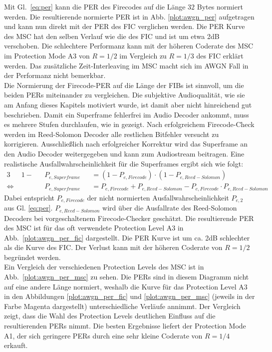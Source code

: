 Mit Gl.~\ref{eq:per} kann die PER des Firecodes auf die Länge $32$ Bytes normiert werden. Die resultierende normierte PER ist in Abb. \ref{plot:awgn_per} aufgetragen und kann nun direkt mit der PER des FIC verglichen werden. Die PER Kurve des MSC hat den selben Verlauf wie die des FIC und ist um etwa 2dB verschoben. Die schlechtere Performanz kann mit der höheren Coderate des MSC im Protection Mode A3 von $R=1/2$ im Vergleich zu $R=1/3$ des FIC erklärt werden. Das zusätzliche Zeit-Interleaving im MSC macht sich im AWGN Fall in der Performanz nicht bemerkbar.\\
Die Normierung der Firecode-PER auf die Länge der FIBs ist sinnvoll, um die beiden PERs miteinander zu vergleichen. Die subjektive Audioqualität, wie sie am Anfang dieses Kapitels motiviert wurde, ist damit aber nicht hinreichend gut beschrieben. Damit ein Superframe fehlerfrei im Audio Decoder ankommt, muss es mehrere Stufen durchlaufen, wie in  gezeigt. Nach erfolgreichem Firecode-Check werden im Reed-Solomon Decoder alle restlichen Bitfehler versucht zu korrigieren. Ausschließlich nach erfolgreicher Korrektur wird das Superframe an den Audio Decoder weitergegeben und kann zum Audiostream beitragen. Eine realistische Ausfallwahrscheinlichkeit für die Superframes ergibt sich wie folgt:
\begin{alignat}{3}
&1-&&P_{e,Superframe} &&= (1-P_{e,Firecode}) \cdot (1-P_{e, Reed-Solomon})\nonumber \\
\Leftrightarrow\; & &&P_{e, Superframe} &&= P_{e,Firecode} + P_{e, Reed-Solomon} - P_{e,Firecode}\cdot P_{e, Reed-Solomon}
\label{eq:per_superframe}
\end{alignat}
Dabei entspricht $P_{e,Firecode}$ der nicht normierten Ausfallwahrscheinlichkeit $P_{e,2}$ aus Gl. \ref{eq:per}. $P_{e,Reed-Solomon}$ wird über die Ausfallrate des Reed-Solomon Decoders bei vorgeschaltenem Firecode-Checker geschätzt. Die resultierende PER des MSC ist für das oft verwendete Protection Level A3 in Abb.~\ref{plot:awgn_per_fic} dargestellt. Die PER Kurve ist um ca. 2dB schlechter als die Kurve des FIC. Der Verlust kann mit der höheren Coderate von $R=1/2$ begründet werden.\\

Ein Vergleich der verschiedenen Protection Levels des MSC ist in Abb.~\ref{plot:awgn_per_msc} zu sehen. Die PERs sind in diesem Diagramm nicht auf eine andere Länge normiert, weshalb die Kurve für das Protection Level A3 in den Abbildungen \ref{plot:awgn_per_fic} und \ref{plot:awgn_per_msc} (jeweils in der Farbe Magenta dargestellt) unterschiedliche Verläufe annimmt. Der Vergleich zeigt, dass die Wahl des Protection Levels deutlichen Einfluss auf die resultierenden PERs nimmt. Die besten Ergebnisse liefert der Protection Mode A1, der sich geringere PERs durch eine sehr kleine Coderate von $R=1/4$ erkauft.

